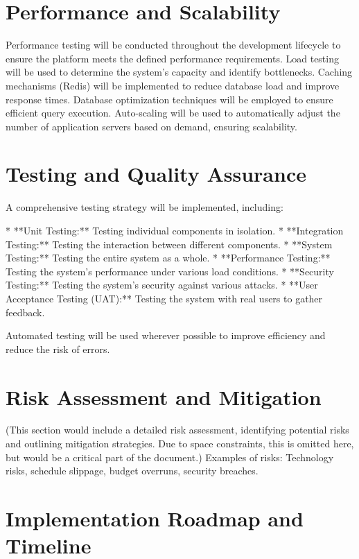 \documentclass[11pt,a4paper,oneside]{article}
\begin{document}
\section{Performance and Scalability}

Performance testing will be conducted throughout the development lifecycle to ensure the platform meets the defined performance requirements.  Load testing will be used to determine the system's capacity and identify bottlenecks.  Caching mechanisms (Redis) will be implemented to reduce database load and improve response times.  Database optimization techniques will be employed to ensure efficient query execution.  Auto-scaling will be used to automatically adjust the number of application servers based on demand, ensuring scalability.

\section{Testing and Quality Assurance}

A comprehensive testing strategy will be implemented, including:

* **Unit Testing:**  Testing individual components in isolation.
* **Integration Testing:**  Testing the interaction between different components.
* **System Testing:**  Testing the entire system as a whole.
* **Performance Testing:**  Testing the system's performance under various load conditions.
* **Security Testing:**  Testing the system's security against various attacks.
* **User Acceptance Testing (UAT):**  Testing the system with real users to gather feedback.

Automated testing will be used wherever possible to improve efficiency and reduce the risk of errors.

\section{Risk Assessment and Mitigation}

(This section would include a detailed risk assessment, identifying potential risks and outlining mitigation strategies.  Due to space constraints, this is omitted here, but would be a critical part of the document.)  Examples of risks:  Technology risks, schedule slippage, budget overruns, security breaches.

\section{Implementation Roadmap and Timeline}
\end{document}
